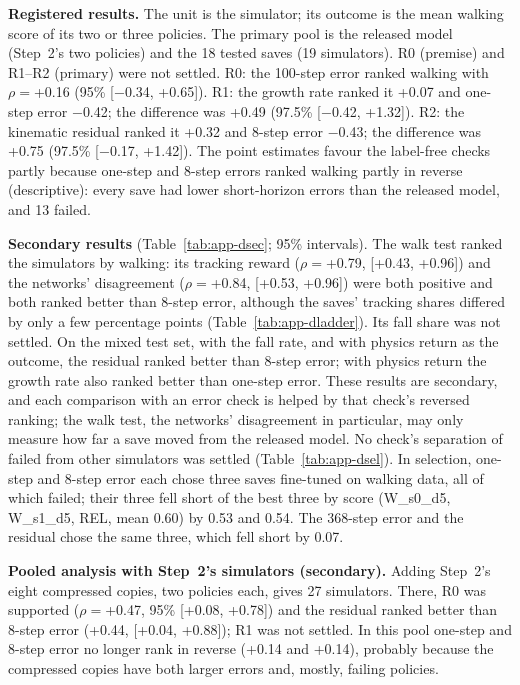 \textbf{Registered results.} The unit is the simulator; its outcome is the mean walking score of its two or three
policies. The primary pool is the released model (Step~2's two policies) and the 18 tested saves
(19 simulators). R0 (premise) and R1--R2 (primary) were not settled. R0: the 100-step error ranked walking
with $\rho={}$+0.16 (95\% [$-$0.34, +0.65]). R1: the growth rate ranked it +0.07 and one-step error
$-$0.42; the difference was +0.49 (97.5\% [$-$0.42, +1.32]). R2: the kinematic residual ranked it
+0.32 and 8-step error $-$0.43; the difference was +0.75 (97.5\% [$-$0.17, +1.42]). The point
estimates favour the label-free checks partly because one-step and 8-step errors ranked walking partly in reverse
(descriptive): every save had lower short-horizon errors than the released model, and 13 failed.

\textbf{Secondary results} (Table~\ref{tab:app-dsec}; 95\% intervals). The walk test ranked the simulators by walking:
its tracking reward ($\rho={}$+0.79, [+0.43, +0.96]) and the networks' disagreement
($\rho={}$+0.84, [+0.53, +0.96]) were both positive and both ranked better than 8-step error, although the saves' tracking shares differed by only a
few percentage points (Table~\ref{tab:app-dladder}). Its fall share was
not settled. On the mixed test set, with the fall rate, and with physics return as the outcome, the residual ranked
better than 8-step error; with physics return the growth rate also ranked better than one-step error. These results
are secondary, and each comparison with an error check is helped by that check's reversed ranking; the walk test, the networks'
disagreement in particular, may only measure how far a save moved from the released model. No check's
separation of failed from other simulators was settled (Table~\ref{tab:app-dsel}). In
selection, one-step and 8-step error each chose three saves fine-tuned on walking data, all of which failed; their three fell short of the best three by score (W\_s0\_d5, W\_s1\_d5, REL, mean 0.60) by 0.53 and
0.54. The 368-step error and the residual chose the same three, which fell short by 0.07.

\textbf{Pooled analysis with Step~2's simulators (secondary).} Adding Step~2's eight compressed copies, two policies
each, gives 27 simulators. There, R0 was supported ($\rho={}$+0.47, 95\% [+0.08, +0.78]) and
the residual ranked better than 8-step error (+0.44, [+0.04, +0.88]); R1 was not settled. In this pool
one-step and 8-step error no longer rank in reverse (+0.14 and +0.14), probably because the
compressed copies have both larger errors and, mostly, failing policies.


